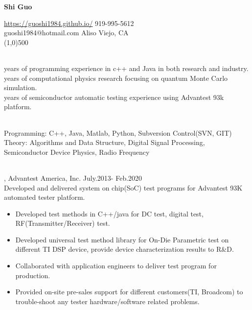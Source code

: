 \documentclass[11pt]{article} %
\begin{document}
 \centerline{\Large \bf Shi Guo}
  \noindent \url{https://guoshi1984.github.io/} \hspace{80mm}  919-995-5612\\
    guoshi1984@hotmail.com \hspace{95mm}   Aliso Viejo, CA\\
\line(1,0){500}


\vspace{2mm}

\\
 years of programming experience in c++ and Java in both research and industry.  \\
 years of computational physics research focusing on quantum Monte Carlo simulation. \\
 years of semiconductor automatic testing experience using Advantest 93k platform.\\


\vspace{0mm}

\\
\noindent 
Programming: C++, Java, Matlab, Python, Subversion Control(SVN, GIT)\\
Theory: Algorithms and Data Structure, Digital Signal Processing, Semiconductor Device Physics, Radio Frequency\\



\vspace{0mm}

\\
, Advantest America, Inc. July.2013- Feb.2020\\
\noindent Developed and delivered system on chip(SoC) test programs for Advantest 93K automated tester platform.\\ 
\begin{itemize}
  
    \item Developed test methods in C++/java for DC test, digital test, RF(Transmitter/Receiver) test.\\
 \vspace{-4mm}
    \item  Developed universal test method library for On-Die Parametric test on different TI DSP device, provide device characterization results to R\&D.\\ 
 \vspace{-4mm}
  \item Collaborated with application engineers to deliver test program for production.\\
 \vspace{-4mm}
  \item Provided on-site pre-sales support for different customers(TI, Broadcom) to trouble-shoot any tester hardware/software related problems.\\ 
 \end{itemize}
\end{document}
